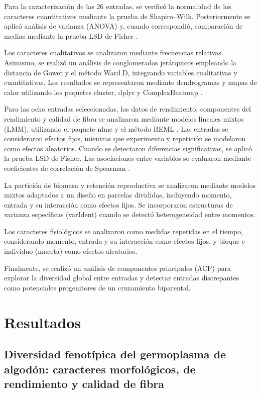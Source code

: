 \documentclass[12pt,oneside]{reedthesis}
\begin{document}
Para la caracterización de las 26 entradas, se verificó la normalidad de los caracteres cuantitativos mediante la prueba de Shapiro--Wilk. Posteriormente se aplicó análisis de varianza (ANOVA) y, cuando correspondió, comparación de medias mediante la prueba LSD de Fisher \autocite{predictmeans}.

Los caracteres cualitativos se analizaron mediante frecuencias relativas. Asimismo, se realizó un análisis de conglomerados jerárquicos empleando la distancia de Gower y el método Ward.D, integrando variables cualitativas y cuantitativas. Los resultados se representaron mediante dendrogramas y mapas de calor utilizando los paquetes cluster, dplyr y ComplexHeatmap \autocite{ComplexHeatmapPackage,dplyrPackage,clusterPackage}.

Para las ocho entradas seleccionadas, los datos de rendimiento, componentes del rendimiento y calidad de fibra se analizaron mediante modelos lineales mixtos (LMM), utilizando el paquete nlme y el método REML \autocite{nlmePackage}. Las entradas se consideraron efectos fijos, mientras que experimento y repetición se modelaron como efectos aleatorios. Cuando se detectaron diferencias significativas, se aplicó la prueba LSD de Fisher. Las asociaciones entre variables se evaluaron mediante coeficientes de correlación de Spearman \autocite{corx}.

La partición de biomasa y retención reproductiva se analizaron mediante modelos mixtos adaptados a un diseño en parcelas divididas, incluyendo momento, entrada y su interacción como efectos fijos. Se incorporaron estructuras de varianza específicas (varIdent) cuando se detectó heterogeneidad entre momentos.

Los caracteres fisiológicos se analizaron como medidas repetidas en el tiempo, considerando momento, entrada y su interacción como efectos fijos, y bloque e individuo (maceta) como efectos aleatorios.

Finalmente, se realizó un análisis de componentes principales (ACP) para explorar la diversidad global entre entradas y detectar entradas discrepantes como potenciales progenitores de un cruzamiento biparental.

\section{Resultados}\label{resultados}

\subsection{Diversidad fenotípica del germoplasma de algodón: caracteres morfológicos, de rendimiento y calidad de fibra}\label{diversidad-fenotuxedpica-del-germoplasma-de-algoduxf3n-caracteres-morfoluxf3gicos-de-rendimiento-y-calidad-de-fibra-1}
\end{document}
